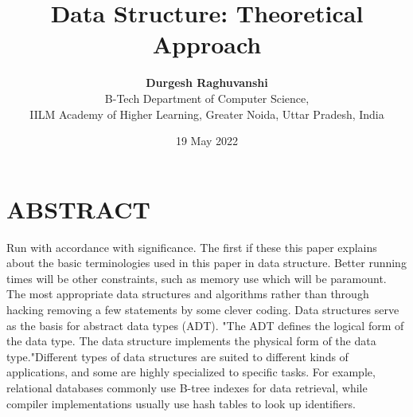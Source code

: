 \documentclass{article}
\title{\textbf{Data Structure: Theoretical Approach}}
\author{\textbf{Durgesh Raghuvanshi}\\B-Tech Department of Computer Science,\\
IILM Academy of Higher Learning, Greater Noida, Uttar Pradesh, India}
\date{19 May 2022}
\begin{document}
\maketitle

\section*{ABSTRACT}
Run with accordance with significance. The first if 
these this paper explains about the basic terminologies 
used in this paper in data structure. Better running 
times will be other constraints, such as memory use 
which will be paramount. The most appropriate data 
structures and algorithms rather than through hacking 
removing a few statements by some clever coding. 
Data structures serve as the basis for abstract data 
types (ADT). "The ADT defines the logical form of 
the data type. The data structure implements the 
physical form of the data type."Different types of data 
structures are suited to different kinds of applications, 
and some are highly specialized to specific tasks. For 
example, relational databases commonly use B-tree 
indexes for data retrieval, while compiler 
implementations usually use hash tables to look up 
identifiers. 
\end{document}
